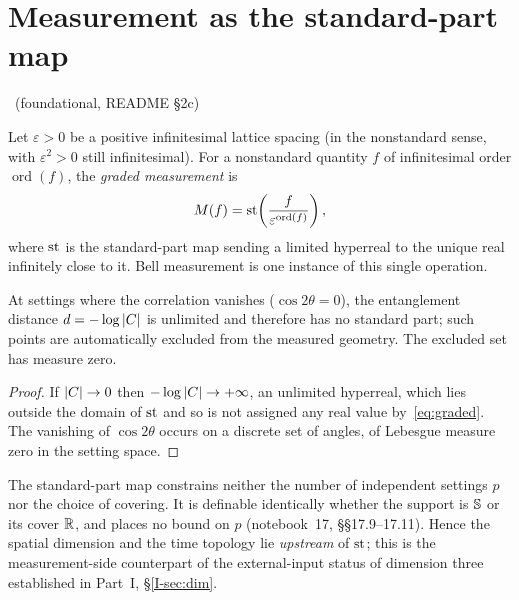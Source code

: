 \documentclass[11pt]{article}
\begin{document}
\section{Measurement as the standard-part map}\label{sec:st}
\established\ (foundational, README \S2c)

\begin{definition}\label{def:st}
Let $\varepsilon>0$ be a positive infinitesimal lattice spacing (in the nonstandard sense,
with $\varepsilon^{2}>0$ still infinitesimal). For a nonstandard quantity $f$ of
infinitesimal order $\operatorname{ord}(f)$, the \emph{graded measurement} is
\begin{equation}
M(f)=\operatorname{st}\!\left(\frac{f}{\varepsilon^{\operatorname{ord}(f)}}\right),
\label{eq:graded}
\end{equation}
where $\operatorname{st}$ is the standard-part map sending a limited hyperreal to the unique real
infinitely close to it. Bell measurement is one instance of this single operation.
\end{definition}

\begin{proposition}\label{prop:exclude}
At settings where the correlation vanishes ($\cos2\theta=0$), the entanglement distance
$d=-\log|C|$ is unlimited and therefore has no standard part; such points are
automatically excluded from the measured geometry. The excluded set has measure zero.
\end{proposition}

\begin{proof}
If $|C|\to0$ then $-\log|C|\to+\infty$, an unlimited hyperreal, which lies outside
the domain of $\operatorname{st}$ and so is not assigned any real value by~\eqref{eq:graded}. The
vanishing of $\cos2\theta$ occurs on a discrete set of angles, of Lebesgue measure zero in
the setting space.
\end{proof}

\begin{remark}\label{rem:st-limits}
The standard-part map constrains neither the number of independent settings $p$ nor the
choice of covering. It is definable identically whether the support is $\mathbb{S}$ or its
cover $\mathbb{R}$, and places no bound on $p$ (notebook~17, \S\S17.9--17.11). Hence the spatial
dimension and the time topology lie \emph{upstream} of $\operatorname{st}$; this is the measurement-side
counterpart of the external-input status of dimension three established in Part~I,
\S\ref{I-sec:dim}.
\end{remark}
\end{document}
